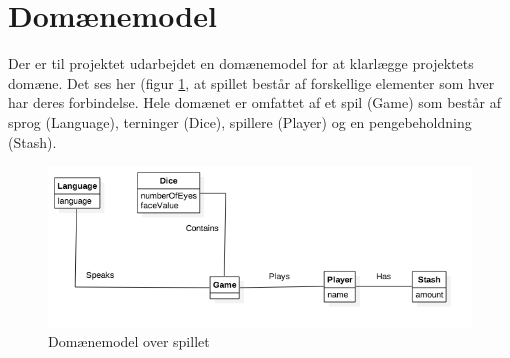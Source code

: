 \section{Domænemodel}

Der er til projektet udarbejdet en domænemodel for at klarlægge projektets domæne.
Det ses her (figur \ref{fig:domaenemodel}, at spillet består af forskellige elementer som hver har deres forbindelse.
Hele domænet er omfattet af et spil (Game) som består af sprog (Language), terninger (Dice), spillere (Player) og en pengebeholdning (Stash).

\begin{figure}[H]
    \begin{center}
        \includegraphics[width=15cm]{graphics/Domainmodel.png}
        \caption{Domænemodel over spillet}
        \label{fig:domaenemodel}
    \end{center}
\end{figure}
